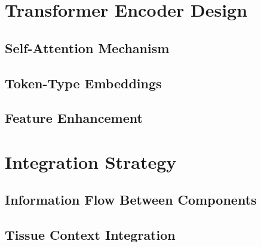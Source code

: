 \section{Transformer Encoder Design}

\subsection{Self-Attention Mechanism}

\subsection{Token-Type Embeddings}

\subsection{Feature Enhancement}

\section{Integration Strategy}

\subsection{Information Flow Between Components}

\subsection{Tissue Context Integration}

